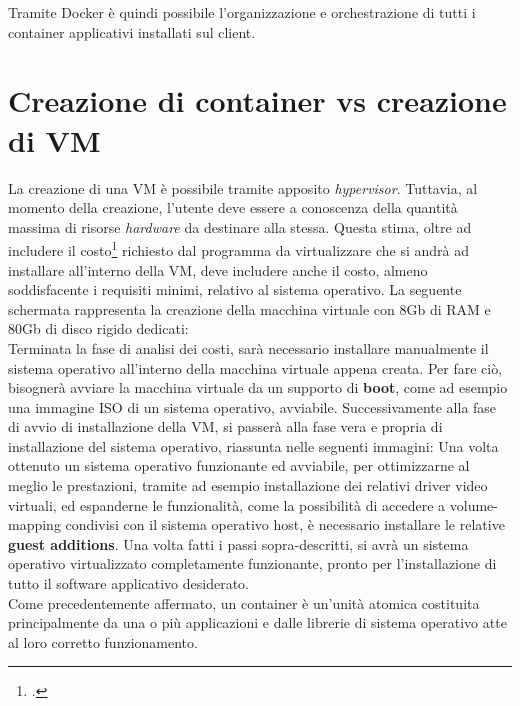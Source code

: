 Tramite Docker è quindi possibile l'organizzazione e orchestrazione di tutti i container applicativi installati sul client.


\section{Creazione di container vs creazione di VM}

La creazione di una VM è possibile tramite apposito \textit{hypervisor}. Tuttavia, al momento della creazione, l'utente deve essere a conoscenza della quantità massima di risorse \textit{hardware} da destinare alla stessa. Questa stima, oltre ad includere il costo\footcite{inteso come quantitativo di risorse fisiche da allocare} richiesto dal programma da virtualizzare che si andrà ad installare all'interno della VM, deve includere anche il costo, almeno soddisfacente i requisiti minimi, relativo al sistema operativo. 
La seguente schermata rappresenta la creazione della macchina virtuale con 8Gb di RAM e 80Gb di disco rigido dedicati:\\
Terminata la fase di analisi dei costi, sarà necessario installare manualmente il sistema operativo all'interno della macchina virtuale appena creata. Per fare ciò, bisognerà avviare la macchina virtuale da un supporto di \textbf{boot}, come ad esempio una immagine \gls{ISO} di un sistema operativo, avviabile.
Successivamente alla fase di avvio di installazione della VM, si passerà alla fase vera e propria di installazione del sistema operativo, riassunta nelle seguenti immagini:
Una volta ottenuto un sistema operativo funzionante ed avviabile, per ottimizzarne al meglio le prestazioni, tramite ad esempio installazione dei relativi \gls{driver} video virtuali, ed espanderne le funzionalità, come la possibilità di accedere a volume-mapping condivisi con il sistema operativo host, è necessario installare le relative \textbf{\gls{guest additions}}.
Una volta fatti i passi sopra-descritti, si avrà un sistema operativo virtualizzato completamente funzionante, pronto per l'installazione di tutto il software applicativo desiderato.
\\
Come precedentemente affermato, un container è un'unità atomica costituita principalmente da una o più applicazioni e dalle librerie di sistema operativo atte al loro corretto funzionamento.
